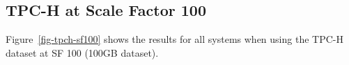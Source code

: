 



\subsection{TPC-H at Scale Factor 100} \label{exp-tpch-sf-100}

Figure~\ref{fig-tpch-sf100} shows the results for all systems when using the TPC-H dataset at SF 100 (\texttildelow 100GB dataset).

